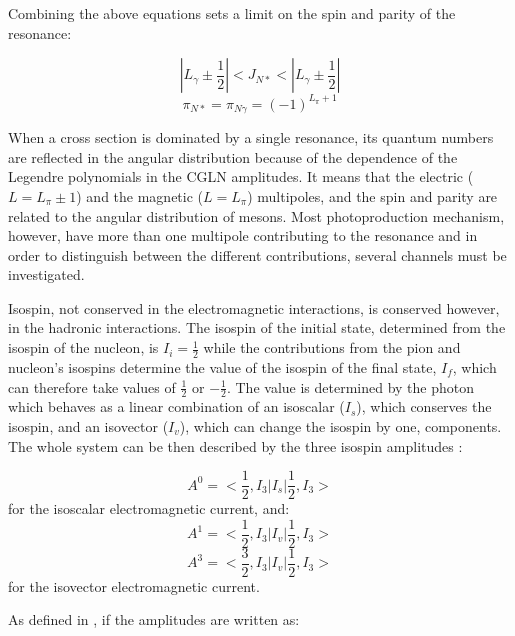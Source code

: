 \indent Combining the above equations sets a limit on the spin and parity of the resonance:

\begin{equation}
\left|L_{\gamma}\pm\frac{1}{2}\right|<J_{N*}<\left|L_{\gamma}\pm\frac{1}{2}\right|
\end{equation}
\begin{equation}
\pi_{N*}=\pi_{N\gamma}=(-1)^{L_{\pi}+1}
\end{equation}

\indent When a cross section is dominated by a single resonance, its quantum numbers are reflected in the angular distribution because of the dependence of the Legendre polynomials in the CGLN amplitudes. It means that the electric ($L={L_{\pi}\pm1}$) and the magnetic ($L={L_{\pi}}$) multipoles, and the spin and parity are related to the angular distribution of mesons. Most photoproduction mechanism, however, have more than one multipole contributing to the resonance and in order to distinguish between the different contributions, several channels must be investigated.

\indent Isospin, not conserved in the electromagnetic interactions, is conserved however, in the hadronic interactions. The isospin of the initial state, determined from the isospin of the nucleon, is $I_{i}=\frac{1}{2}$ while the contributions from the pion and nucleon's isospins determine the value of the isospin of the final state, $I_{f}$, which can therefore take values of $\frac{1}{2}$ or $-\frac{1}{2}$. The value is determined by the photon which behaves as a linear combination of an isoscalar ($I_{s}$), which conserves the isospin, and an isovector ($I_{v}$), which can change the isospin by one, components. The whole system can be then described by the three isospin amplitudes \cite{nagl}:

\begin{equation}
A^{0}=<\frac{1}{2},I_{3}|I_{s}|\frac{1}{2},I_{3}>
\end{equation}
for the isoscalar electromagnetic current, and:
\begin{equation}
A^{1}=<\frac{1}{2},I_{3}|I_{v}|\frac{1}{2},I_{3}>
\end{equation}
\begin{equation}
A^{3}=<\frac{3}{2},I_{3}|I_{v}|\frac{1}{2},I_{3}>
\end{equation}
for the isovector electromagnetic current.

\indent As defined in \cite{davidson}, if the amplitudes are written as:

